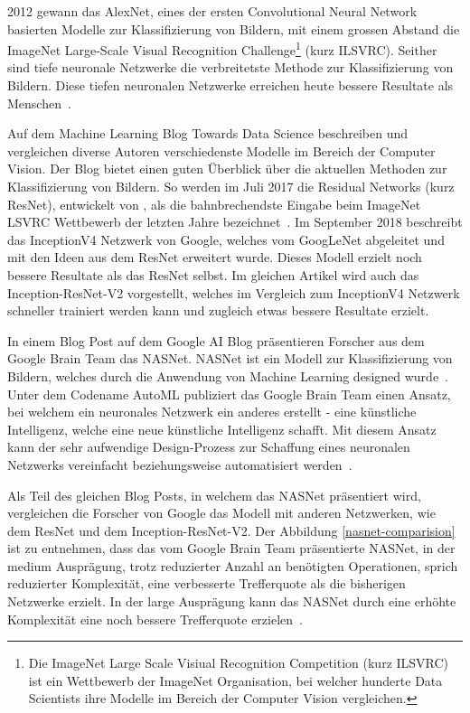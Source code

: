 2012 gewann das AlexNet, eines der ersten Convolutional Neural Network basierten Modelle zur Klassifizierung von Bildern, mit einem grossen Abstand die ImageNet Large-Scale Visual Recognition Challenge\footnote{Die ImageNet Large Scale Visiual Recognition Competition (kurz ILSVRC) ist ein Wettbewerb der ImageNet Organisation, bei welcher hunderte Data Scientists ihre Modelle im Bereich der Computer Vision vergleichen.} (kurz ILSVRC). Seither sind tiefe neuronale Netzwerke die verbreitetste Methode zur Klassifizierung von Bildern. Diese tiefen neuronalen Netzwerke erreichen heute bessere Resultate als Menschen~\autocite{SSD}.

Auf dem Machine Learning Blog Towards Data Science beschreiben und vergleichen diverse Autoren verschiedenste Modelle im Bereich der Computer Vision. Der Blog bietet einen guten Überblick über die aktuellen Methoden zur Klassifizierung von Bildern. So werden im Juli 2017 die Residual Networks (kurz ResNet), entwickelt von \textcite{He2015}, als die bahnbrechendste Eingabe beim ImageNet LSVRC Wettbewerb der letzten Jahre bezeichnet~\autocite{Fungg2017ResNet}. Im September 2018 beschreibt \textcite{SHTsuang2018Inception} das InceptionV4 Netzwerk von Google, welches vom GoogLeNet abgeleitet und mit den Ideen aus dem ResNet erweitert wurde. Dieses Modell erzielt noch bessere Resultate als das ResNet selbst. Im gleichen Artikel wird auch das Inception-ResNet-V2 vorgestellt, welches im Vergleich zum InceptionV4 Netzwerk schneller trainiert werden kann und zugleich etwas bessere Resultate erzielt. 

In einem Blog Post auf dem Google AI Blog präsentieren Forscher aus dem Google Brain Team das NASNet. NASNet ist ein Modell zur Klassifizierung von Bildern, welches durch die Anwendung von Machine Learning designed wurde~\autocite{GoogleNasNet}. Unter dem Codename AutoML publiziert das Google Brain Team einen Ansatz, bei welchem ein neuronales Netzwerk ein anderes erstellt - eine künstliche Intelligenz, welche eine neue künstliche Intelligenz schafft. Mit diesem Ansatz kann der sehr aufwendige Design-Prozess zur Schaffung eines neuronalen Netzwerks vereinfacht beziehungsweise automatisiert werden~\autocite{GoogleAutoML}.

Als Teil des gleichen Blog Posts, in welchem das NASNet präsentiert wird, vergleichen die Forscher von Google das Modell mit anderen Netzwerken, wie dem ResNet und dem Inception-ResNet-V2. Der Abbildung \ref{nasnet-comparision} ist zu entnehmen, dass das vom Google Brain Team präsentierte NASNet, in der medium Ausprägung, trotz reduzierter Anzahl an benötigten Operationen, sprich reduzierter Komplexität, eine verbesserte Trefferquote als die bisherigen Netzwerke erzielt. In der large Ausprägung kann das NASNet durch eine erhöhte Komplexität eine noch bessere Trefferquote erzielen~\autocite{GoogleNasNet}.

